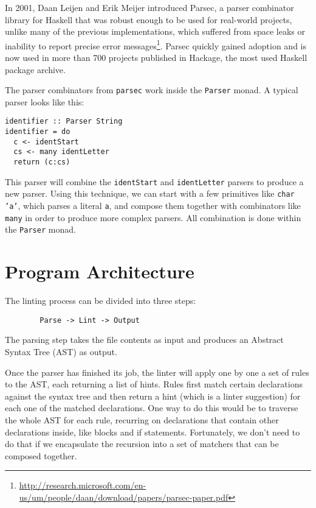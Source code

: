 \documentclass[]{article}
\begin{document}
In 2001, Daan Leijen and Erik Meijer introduced Parsec, a parser combinator
library for Haskell that was robust enough to be used for real-world projects,
unlike many of the previous implementations, which suffered from space leaks
or inability to report precise error messages\footnote{\url{http://research.microsoft.com/en-us/um/people/daan/download/papers/parsec-paper.pdf}}.
Parsec quickly gained adoption and is now used in more than 700 projects
published in Hackage, the most used Haskell package archive.

The parser combinators from \texttt{parsec} work inside the \texttt{Parser} monad.
A typical parser looks like this:

\begin{lstlisting}
identifier :: Parser String
identifier = do
  c <- identStart
  cs <- many identLetter
  return (c:cs)
\end{lstlisting}

This parser will combine the \texttt{identStart} and \texttt{identLetter}
parsers to produce a new parser. Using this technique, we can start with
a few primitives like \texttt{char 'a'}, which parses a literal \texttt{a},
and compose them together with combinators like \texttt{many} in order to
produce more complex parsers. All combination is done within the \texttt{Parser}
monad.

\section{Program Architecture}\label{program-architecture}

The linting process can be divided into three steps:

\begin{verbatim}
        Parse -> Lint -> Output
\end{verbatim}

The parsing step takes the file contents as input and produces an
Abstract Syntax Tree (AST) as output.

Once the parser has finished its job, the linter will apply one by one
a set of rules to the AST, each returning a list of hints. Rules first
match certain declarations against the syntax tree and then return a hint
(which is a linter suggestion) for each one of the matched declarations.
One way to do this would be to traverse the whole AST for each rule,
recurring on declarations that contain other declarations inside, like
blocks and if statements. Fortunately, we don't need to do that if we
encapsulate the recursion into a set of matchers that can be composed
together.
\end{document}
